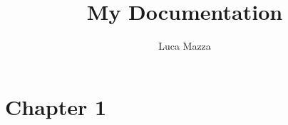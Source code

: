 \documentclass{article}
\title{\textbf{My Documentation}}
\author{Luca Mazza}
\begin{document}
\maketitle
\newpage
\tableofcontents
\newpage
\section{Chapter 1}\label{chapter-1}
\newpage
\end{document}

